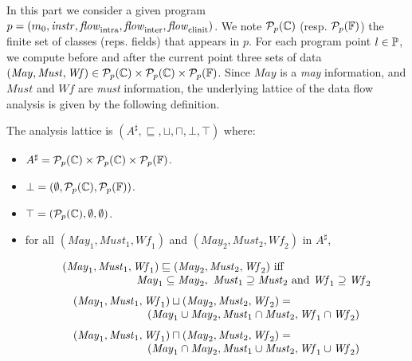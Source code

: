 \documentclass{entcs}
\newcommand{\may}{\ensuremath{\mathit{May}}}
\newcommand{\must}{\ensuremath{\mathit{Must}}}
\newcommand{\wf}{\ensuremath{\mathit{Wf}}}
\newcommand{\flow}{\mathit{flow}}
\newcommand{\intraflow}{\flow_{\rm intra}}
\newcommand{\interflow}{\flow_{\rm inter}}
\newcommand{\clinitflow}{\flow_{\rm clinit}}
\begin{document}
In this part we consider a given program $p=
(m_0,\instrAt,\intraflow,\interflow,\clinitflow)$.  We note
$\mathcal{P}_p(\mathbb{C})$ (resp. $\mathcal{P}_p(\mathbb{F})$) the finite set of classes
(reps. fields) that appears in $p$.  For each program point $l\in\mathbb{P}$,
we compute before and after the current point three sets of data
$(\may,\must,\wf)\in\Pow_p(\class)\times\Pow_p(\class)\times\Pow_p(\fields)$.
Since $\may$ is a \emph{may} information, and $\must$ and $\wf$ are
\emph{must} information, the underlying lattice of the data flow
analysis is given by the following definition.
\begin{definition}
  The analysis lattice is $(A^\sharp,\sqsubseteq,\sqcup,\sqcap,\bot,\top)$ where:
  \begin{itemize}
  \item $A^\sharp =
    \mathcal{P}_p(\mathbb{C})\times\mathcal{P}_p(\mathbb{C})\times\mathcal{P}_p(\mathbb{F})$.
  \item $\bot=(\emptyset,\mathcal{P}_p(\mathbb{C}),\mathcal{P}_p(\mathbb{F}))$.
  \item $\top=(\mathcal{P}_p(\mathbb{C}),\emptyset,\emptyset)$.
  \item for all $(\may_1,\must_1,\wf_1)$ and $(\may_2,\must_2,\wf_2)$
    in $A^\sharp$,\vspace*{-3ex}

    $$
    \begin{array}[c]{l}
      (\may_1,\must_1,\wf_1)\sqsubseteq(\may_2,\must_2,\wf_2)~\mathrm{iff}\\
      ~~~~~~~~~~~~~~~~~~~~
      \may_1 \subseteq \may_2,\ \must_1 \supseteq \must_2~\mathrm{and}~\wf_1 \supseteq \wf_2\\
    \end{array}
    $$\vspace*{-2ex}
    $$
    \begin{array}[c]{l}
      (\may_1,\must_1,\wf_1)\sqcup(\may_2,\must_2,\wf_2) = \\
      ~~~~~~~~~~~~~~~~~~~~
      (\may_1 \cup \may_2, \must_1 \cap \must_2,\wf_1 \cap \wf_2)\\
    \end{array}
    $$\vspace*{-2ex}
    $$
    \begin{array}[c]{l}
      (\may_1,\must_1,\wf_1)\sqcap(\may_2,\must_2,\wf_2) = \\
      ~~~~~~~~~~~~~~~~~~~~
      (\may_1 \cap \may_2, \must_1 \cup \must_2,\wf_1 \cup \wf_2)
    \end{array}
   $$
 \end{itemize}
\end{definition}
\end{document}
